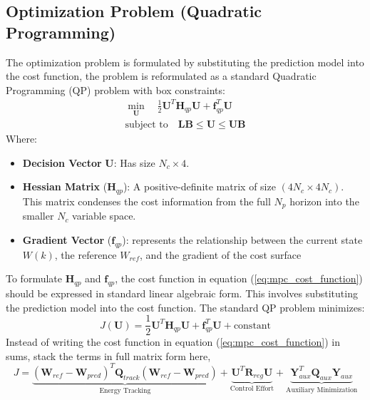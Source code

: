 \subsection{Optimization Problem (Quadratic Programming)}
The optimization problem is formulated by substituting the prediction model into the cost function,
the problem is reformulated as a standard Quadratic Programming (QP) problem with box constraints:
\begin{equation}
    \begin{split}
        \min_{\mathbf{U}} \quad \frac{1}{2} \mathbf{U}^T \mathbf{H}_{qp} \mathbf{U} + \mathbf{f}_{qp}^T \mathbf{U} \\
        \text{subject to} \quad \mathbf{LB} \leq \mathbf{U} \leq \mathbf{UB}
    \end{split}
    \label{eq:QP_optimization_problem}
\end{equation}
Where:
\begin{itemize}
    \item \textbf{Decision Vector} $\mathbf{U}$: Has size $N_c \times 4$.
    \item \textbf{Hessian Matrix} ($\mathbf{H}_{qp}$): A positive-definite matrix of size $(4N_c \times 4N_c)$.
          This matrix condenses the cost information from the full $N_p$ horizon into the smaller $N_c$ variable space.
    \item \textbf{Gradient Vector} ($\mathbf{f}_{qp}$): represents the relationship between the current state $W(k)$,
          the reference $W_{ref}$, and the gradient of the cost surface
\end{itemize}
To formulate $\mathbf{H}_{qp}$ and $\mathbf{f}_{qp}$, the cost function in equation (\ref{eq:mpc_cost_function}) should be expressed
in standard linear algebraic form. This involves substituting the prediction model into the cost function.
The standard QP problem minimizes:
\begin{equation}
    J(\mathbf{U}) = \frac{1}{2} \mathbf{U}^T \mathbf{H}_{qp} \mathbf{U} + \mathbf{f}_{qp}^T \mathbf{U} + \text{constant}
    \label{eq:standard_qp_form}
\end{equation}
Instead of writing the cost function in equation (\ref{eq:mpc_cost_function}) in sums, stack the terms in full matrix form here,
\begin{equation}
    J = \underbrace{(\mathbf{W}_{ref} - \mathbf{W}_{pred})^T \mathbf{Q}_{track} (\mathbf{W}_{ref} - \mathbf{W}_{pred})}_{\text{Energy Tracking}}
    + \underbrace{\mathbf{U}^T \mathbf{R}_{reg} \mathbf{U}}_{\text{Control Effort}}
    + \underbrace{\mathbf{Y}_{aux}^T \mathbf{Q}_{aux} \mathbf{Y}_{aux}}_{\text{Auxiliary Minimization}}
    \label{eq:mpc_cost_function_matrix}
\end{equation}
